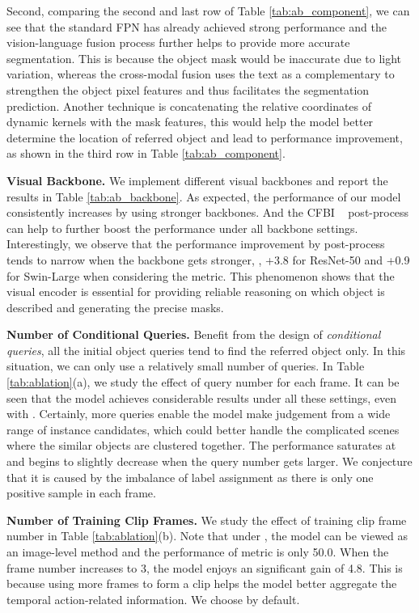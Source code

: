 \documentclass[10pt,twocolumn,letterpaper]{article}
\newcommand{\myparagraph}[1]{{\vspace{.5em} \noindent \bf #1}}
\begin{document}
{Second, comparing the second and last row of Table \ref{tab:ab_component}, we can see that the standard FPN has already achieved strong performance and the vision-language fusion process further helps to provide more accurate segmentation. This is because the object mask would be inaccurate due to light variation, whereas the cross-modal fusion uses the text as a complementary to strengthen the object pixel features and thus facilitates the segmentation prediction. Another technique is concatenating the relative coordinates of dynamic kernels with the mask features, this would help the model better determine the location of referred object and lead to performance improvement, as shown in the third row in Table \ref{tab:ab_component}.

\myparagraph{Visual Backbone.} We implement different visual backbones and report the results in Table \ref{tab:ab_backbone}. As expected, the performance of our model consistently increases by using stronger backbones. And the CFBI ~\cite{yang2020cfbi} post-process can help to further boost the performance under all backbone settings. Interestingly, we observe that the performance improvement by post-process tends to narrow when the backbone gets stronger, \eg, +3.8 for ResNet-50 and +0.9 for Swin-Large when considering the  metric. This phenomenon shows that the visual encoder is essential for providing reliable reasoning on which object is described and generating the precise masks.




\myparagraph{Number of Conditional Queries.} Benefit from the design of \textit{conditional queries}, all the initial object queries tend to find the referred object only. In this situation, we can only use a relatively small number of queries. In Table \ref{tab:ablation}(a), we study the effect of query number for each frame. It can be seen that the model achieves considerable results under all these settings, even with . Certainly, more queries enable the model make judgement from a wide range of instance candidates, which could better handle the complicated scenes where the similar objects are clustered together. The performance saturates at  and begins to slightly decrease when the query number gets larger. We conjecture that it is caused by the imbalance of label assignment as there is only one positive sample in each frame.

\myparagraph{Number of Training Clip Frames.} We study the effect of training clip frame number in Table \ref{tab:ablation}(b). Note that under , the model can be viewed as an image-level method and the performance of metric  is only 50.0. When the frame number increases to 3, the model enjoys an significant  gain of 4.8. This is because using more frames to form a clip helps the model better aggregate the temporal action-related information. We choose  by default.

}
\end{document}
